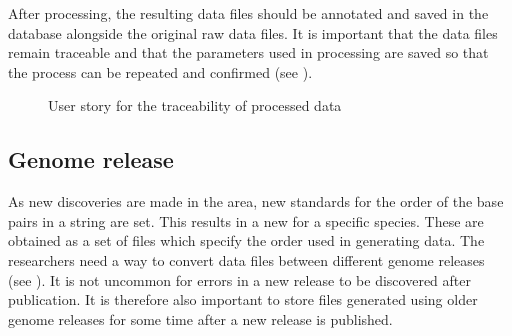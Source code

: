 After processing, the resulting  data files should be annotated and saved in the database alongside the original raw data files. It is important that the  data files remain traceable and that the parameters used in processing are saved so that the process can be repeated and confirmed (see ).

\begin{figure}[h]
\caption{User story for the traceability of processed data}
\label{fig:target_trace}
\end{figure}



\subsection{Genome release}
As new discoveries are made in the area, new standards for the order of the base pairs in a  string are set. This results in a new  for a specific species. These are obtained as a set of files which specify the order used in generating  data. The researchers need a way to convert  data files between different genome releases (see ). It is not uncommon for errors in a new release to be discovered after publication. It is therefore also important to store files generated using older genome releases for some time after a new release is published.

